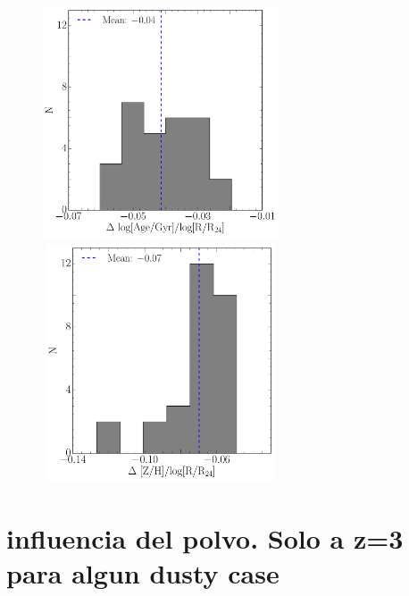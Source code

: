 \begin{figure}[H]
 \includegraphics[height=7cm, width=7cm]{../al_final/estrellas/stack/ajustes/gradiente_edad_z0.pdf}
 \includegraphics[height=7cm, width=7cm]{../al_final/estrellas/stack/ajustes/gradiente_metalicidad_z0.pdf}
\end{figure}



\section{influencia del polvo. Solo a z=3 para algun dusty case}

